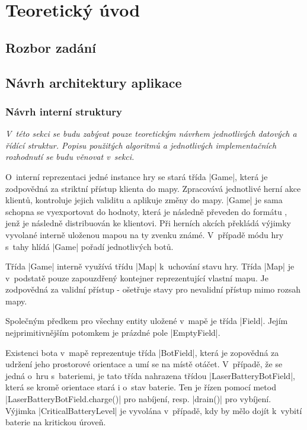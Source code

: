 
\section{Teoretický úvod}

\subsection{Rozbor zadání}
\subsection{Návrh architektury aplikace}

\subsubsection{Návrh interní struktury}

\textit{
	V~této sekci se budu zabývat pouze teoretickým návrhem jednotlivých datových a řídící struktur. Popisu použitých algoritmů a jednotlivých implementačních rozhodnutí se budu věnovat v~sekci.
}

O~interní reprezentaci jedné instance hry se stará třída \ic|Game|, která je zodpovědná za striktní přístup klienta do mapy. Zpracovává jednotlivé herní akce klientů, kontroluje jejich validitu a aplikuje změny do mapy. \ic|Game| je sama schopna se vyexportovat do hodnoty, která je následně převeden do formátu , jenž je následně distribuován ke klientovi. Při herních akcích překládá výjimky vyvolané interně uloženou mapou na ty zvenku známé. V~případě módu hry s~tahy hlídá \ic|Game| pořadí jednotlivých botů.

Třída \ic|Game| interně využívá třídu \ic|Map| k~uchování stavu hry. Třída \ic|Map| je v~podstatě pouze zapouzdřený kontejner reprezentující vlastní mapu. Je zodpovědná za validní přístup - ošetřuje stavy pro nevalidní přístup mimo rozsah mapy.

Společným předkem pro všechny entity uložené v~mapě je třída \ic|Field|. Jejím nejprimitivnějším potomkem je prázdné pole \ic|EmptyField|.

\begin{sloppypar}
	Existenci bota v~mapě reprezentuje třída \ic|BotField|, která je zopovědná za udržení jeho prostorové orientace a umí se na místě otáčet. V~případě, že se jedná o~hru s~bateriemi, je tato třída nahrazena třídou \ic|LaserBatteryBotField|, která se kromě orientace stará i o~stav baterie. Ten je řízen pomocí metod \ic|LaserBatteryBotField.charge()| pro nabíjení, resp. \ic|drain()| pro vybíjení. Výjimka \ic|CriticalBatteryLevel| je vyvolána v~případě, kdy by mělo dojít k~vybití baterie na kritickou úroveň.
\end{sloppypar}

